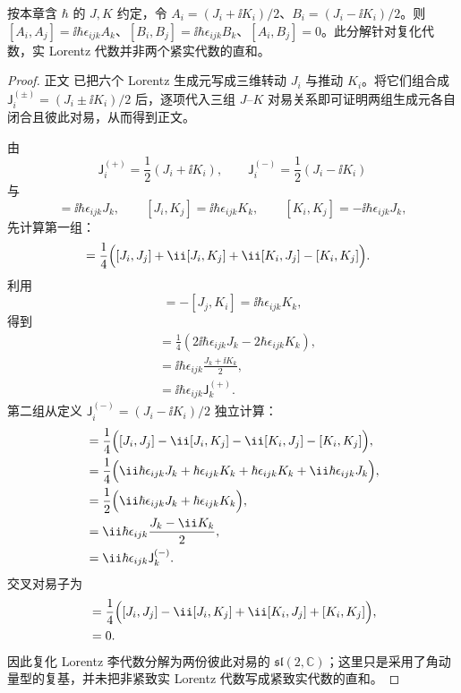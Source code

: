 \begin{theorem}
按本章含 $\hbar$ 的 $J,K$ 约定，令 $A_i=(J_i+\ii K_i)/2$、$B_i=(J_i-\ii K_i)/2$。则 $[A_i,A_j]=\ii\hbar\epsilon_{ijk}A_k$、$[B_i,B_j]=\ii\hbar\epsilon_{ijk}B_k$、$[A_i,B_j]=0$。此分解针对复化代数，实 Lorentz 代数并非两个紧实代数的直和。
\end{theorem}

\begin{proof}
正文 已把六个 Lorentz 生成元写成三维转动 $J_i$ 与推动 $K_i$。将它们组合成 $\mathsf J_i^{(\pm)}=(J_i\pm\ii K_i)/2$ 后，逐项代入三组 $J$--$K$ 对易关系即可证明两组生成元各自闭合且彼此对易，从而得到正文。



由
\begin{equation*}
 \mathsf J_i^{(+)}=\frac12(J_i+\ii K_i),
 \qquad
 \mathsf J_i^{(-)}=\frac12(J_i-\ii K_i)
\end{equation*}
与
\begin{equation*}
 [J_i,J_j]=\ii\hbar\epsilon_{ijk}J_k,
 \qquad
 [J_i,K_j]=\ii\hbar\epsilon_{ijk}K_k,
 \qquad
 [K_i,K_j]=-\ii\hbar\epsilon_{ijk}J_k,
\end{equation*}
先计算第一组：
\begin{align*}
 [\mathsf J_i^{(+)},\mathsf J_j^{(+)}]
 &=\frac14\Bigl(
 [J_i,J_j]+\ii[J_i,K_j]
 +\ii[K_i,J_j]-[K_i,K_j]\Bigr).
\end{align*}
利用
\begin{equation*}
 [K_i,J_j]=-[J_j,K_i]
 =\ii\hbar\epsilon_{ijk}K_k,
\end{equation*}
得到
\begin{align*}
 [\mathsf J_i^{(+)},\mathsf J_j^{(+)}]
 &=\frac14\left(
 2\ii\hbar\epsilon_{ijk}J_k
 -2\hbar\epsilon_{ijk}K_k\right),\\
 &=\ii\hbar\epsilon_{ijk}
 \frac{J_k+\ii K_k}{2},\\
 &=\ii\hbar\epsilon_{ijk}\mathsf J_k^{(+)}.
\end{align*}
第二组从定义 $\mathsf J_i^{(-)}=(J_i-\ii K_i)/2$ 独立计算：
\begin{align*}
 [\mathsf J_i^{(-)},\mathsf J_j^{(-)}]
 &=\frac14\Bigl(
 [J_i,J_j]-\ii[J_i,K_j]
 -\ii[K_i,J_j]-[K_i,K_j]\Bigr),\\
 &=\frac14\Bigl(
 \ii\hbar\epsilon_{ijk}J_k
 +\hbar\epsilon_{ijk}K_k
 +\hbar\epsilon_{ijk}K_k
 +\ii\hbar\epsilon_{ijk}J_k\Bigr),\\
 &=\frac12\Bigl(
 \ii\hbar\epsilon_{ijk}J_k
 +\hbar\epsilon_{ijk}K_k\Bigr),\\
 &=\ii\hbar\epsilon_{ijk}\frac{J_k-\ii K_k}{2},\\
 &=\ii\hbar\epsilon_{ijk}\mathsf J_k^{(-)}.
\end{align*}
交叉对易子为
\begin{align*}
 [\mathsf J_i^{(+)},\mathsf J_j^{(-)}]
 &=\frac14\Bigl(
 [J_i,J_j]-\ii[J_i,K_j]
 +\ii[K_i,J_j]+[K_i,K_j]\Bigr),\\
 &=0.
\end{align*}
因此复化 Lorentz 李代数分解为两份彼此对易的 $\mathfrak{sl}(2,\mathbb C)$；这里只是采用了角动量型的复基，并未把非紧致实 Lorentz 代数写成紧致实代数的直和。
\end{proof}

